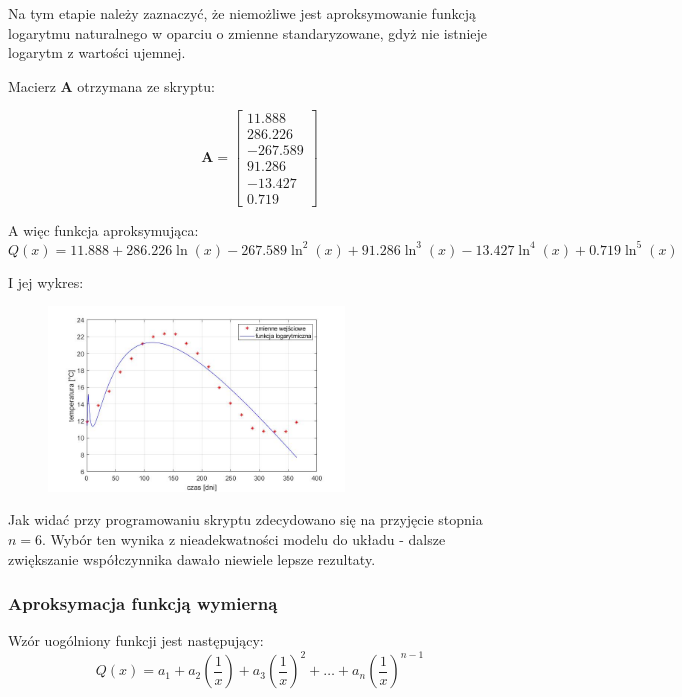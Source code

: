 \documentclass[a4paper, 12pt]{mwart}
\begin{document}
				Na tym etapie należy zaznaczyć, że niemożliwe jest aproksymowanie funkcją logarytmu
				naturalnego w oparciu o zmienne standaryzowane, gdyż nie istnieje logarytm z wartości
				ujemnej.

				Macierz $\textbf{A}$ otrzymana ze skryptu:

				$$\textbf{A} = \begin{bmatrix}
					11.888\\
					286.226\\
					-267.589\\
					91.286\\
					-13.427\\
					0.719
				\end{bmatrix}$$

				A więc funkcja aproksymująca:
				$$Q(x) = 11.888 + 286.226 \ln \left(x\right) -267.589 \ln^2 \left(x\right)
				+ 91.286 \ln^3 \left(x\right) -13.427 \ln^4 \left(x\right) +0.719 \ln^5 \left(x\right)$$

				I jej wykres:
				\begin{figure}[h]
					\begin{center}
						\includegraphics[width = 0.7\textwidth]{graphs/4-n.jpg}
					\end{center}
				\end{figure}

				Jak widać przy programowaniu skryptu zdecydowano się na przyjęcie stopnia $n=6$.
				Wybór ten wynika z nieadekwatności modelu do układu - dalsze zwiększanie współczynnika dawało
				niewiele lepsze rezultaty.

			\subsubsection{Aproksymacja funkcją wymierną}
				Wzór uogólniony funkcji jest następujący:
				$$Q(x) = a_1 + a_2 \left(\frac{1}{x}\right) + a_3 \left(\frac{1}{x}\right)^2 + \dots + a_n \left(\frac{1}{x}\right)^{n-1}$$
\end{document}
